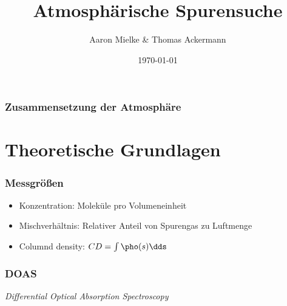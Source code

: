 \documentclass{beamer}
\title{Atmosphärische Spurensuche}
\author{Aaron Mielke \& Thomas Ackermann}
\date{\today}
\begin{document}
\maketitle


\begin{frame}
\frametitle{Zusammensetzung der Atmosphäre}
    \section{Theoretische Grundlagen}

\end{frame}

\begin{frame}
\frametitle{Messgrößen}
    \begin{itemize}
        \item Konzentration: Moleküle pro Volumeneinheit
        \item Mischverhältnis: Relativer Anteil von Spurengas zu Luftmenge
        \item Columnd density: $CD = \int \pho (s) \dds$
    \end{itemize}
\end{frame}

\begin{frame}
    \frametitle{DOAS}
    \textit{Differential Optical Absorption Spectroscopy}

\end{frame}
\end{document}
